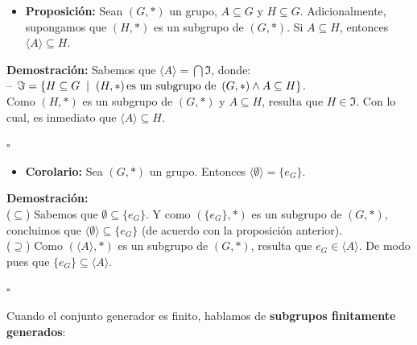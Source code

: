 \documentclass[10 pt]{article}
\begin{document}
\begin{itemize}
    \item \Large{\textbf{Proposición:} Sean $(G,*)$ un grupo, $A \subseteq G$ y $H \subseteq G$. Adicionalmente, supongamos que $(H,*)$ es un subgrupo de $(G,*)$. Si $A \subseteq H$, entonces $\langle A \rangle \subseteq H$.} \\
\end{itemize}

\Large{\textbf{Demostración:} Sabemos que $\langle A \rangle =\bigcap \Im$, donde: \\

-- $\Im=\{H \subseteq G \hspace{0.2 cm}|\hspace{0.2 cm} (H,*)\, \text{es un subgrupo de } \, (G,*) \land A \subseteq H\}$. \\

Como $(H,*)$ es un subgrupo de $(G,*)$ y $A \subseteq H$, resulta que $H \in \Im$. Con lo cual, es inmediato que $\langle A \rangle \subseteq H$.} \\

\begin{flushright}
    $\square$
\end{flushright}

\begin{itemize}
    \item \Large{\textbf{Corolario:} Sea $(G,*)$ un grupo. Entonces $\langle \emptyset \rangle=\{e_G\}$.} \\
\end{itemize}

\Large{\textbf{Demostración:} \\

($\subseteq$) Sabemos que $\emptyset \subseteq \{e_G\}$. Y como $(\{e_G\},*)$ es un subgrupo de $(G,*)$, concluimos que $\langle \emptyset \rangle \subseteq \{e_G\}$ (de acuerdo con la proposición anterior). \\

($\supseteq$) Como $(\langle A \rangle,*)$ es un subgrupo de $(G,*)$, resulta que $e_G \in \langle A \rangle$. De modo pues que $\{e_G\} \subseteq \langle A \rangle$.} \\

\begin{flushright}
    $\square$
\end{flushright}

\Large{Cuando el conjunto generador es finito, hablamos de \textbf{subgrupos finitamente generados}:} \\
\end{document}
